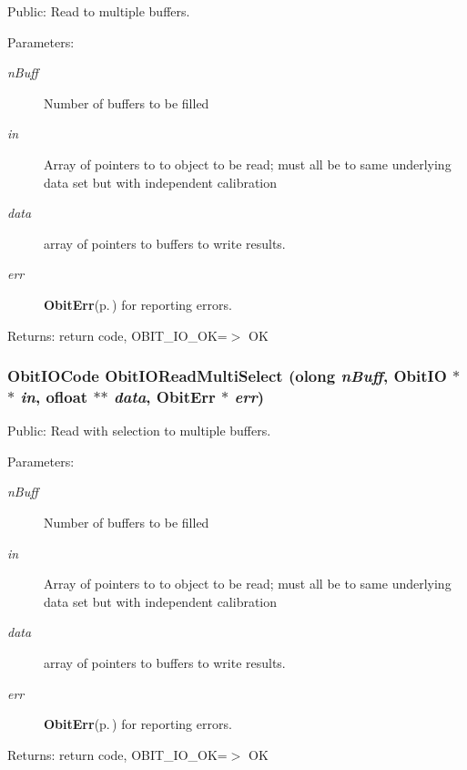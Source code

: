 Public: Read to multiple buffers. 

\begin{Desc}
\item[Parameters:]
\begin{description}
\item[{\em n\-Buff}]Number of buffers to be filled \item[{\em in}]Array of pointers to to object to be read; must all be to same underlying data set but with independent calibration \item[{\em data}]array of pointers to buffers to write results. \item[{\em err}]{\bf Obit\-Err}{\rm (p.\,\pageref{structObitErr})} for reporting errors. \end{description}
\end{Desc}
\begin{Desc}
\item[Returns:]return code, OBIT\_\-IO\_\-OK=$>$ OK \end{Desc}
\subsubsection{\setlength{\rightskip}{0pt plus 5cm}Obit\-IOCode Obit\-IORead\-Multi\-Select ({\bf olong} {\em n\-Buff}, {\bf Obit\-IO} $\ast$$\ast$ {\em in}, {\bf ofloat} $\ast$$\ast$ {\em data}, {\bf Obit\-Err} $\ast$ {\em err})}\label{ObitIO_8h_a42}


Public: Read with selection to multiple buffers. 

\begin{Desc}
\item[Parameters:]
\begin{description}
\item[{\em n\-Buff}]Number of buffers to be filled \item[{\em in}]Array of pointers to to object to be read; must all be to same underlying data set but with independent calibration \item[{\em data}]array of pointers to buffers to write results. \item[{\em err}]{\bf Obit\-Err}{\rm (p.\,\pageref{structObitErr})} for reporting errors. \end{description}
\end{Desc}
\begin{Desc}
\item[Returns:]return code, OBIT\_\-IO\_\-OK=$>$ OK \end{Desc}
